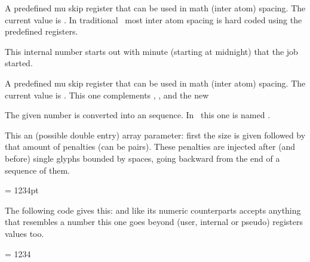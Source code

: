 \stopoldprimitive

\startoldprimitive[title={\prm {thinmuskip}}]

A predefined mu skip register that can be used in math (inter atom) spacing. The
current value is {\tt \the\thinmuskip}. In traditional \TEX\ most inter atom
spacing is hard coded using the predefined registers.

\stopoldprimitive

\startoldprimitive[title={\prm {time}}]

This internal number starts out with minute (starting at midnight) that the job
started.

\stopoldprimitive

\startnewprimitive[title={\prm {tinymuskip}}]

A predefined mu skip register that can be used in math (inter atom) spacing. The
current value is {\tt \the\tinymuskip}. This one complements ,
,  and the new 

\stopnewprimitive

\startnewprimitive[title={\prm {tocharacter}}]

The given number is converted into an  sequence. In \LUATEX\ this one is
named \type {\Uchar}.

\stopnewprimitive

\startnewprimitive[title={\prm {toddlerpenalties}}]

This an (possible double entry) array parameter: first the size is given followed
by that amount of penalties (can be pairs). These penalties are injected after
(and before) single glyphs bounded by spaces, going backward from the end of a
sequence of them.

\stopnewprimitive

\startnewprimitive[title={\prm {todimension}}]

\startbuffer
\scratchdimen = 1234pt \todimension\scratchdimen
\stopbuffer

The following code gives this: {\nospacing\inlinebuffer} and like its numeric
counterparts accepts anything that resembles a number this one goes beyond
(user, internal or pseudo) registers values too.

\typebuffer

\stopnewprimitive

\startnewprimitive[title={\prm {tohexadecimal}}]

\startbuffer
\scratchcounter = 1234 \tohexadecimal\scratchcounter
\stopbuffer

